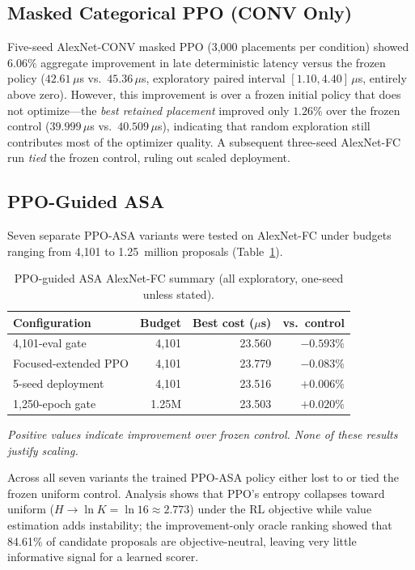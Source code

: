 \documentclass[10pt,conference]{IEEEtran}
\begin{document}
\subsection{Masked Categorical PPO (CONV Only)}

Five-seed AlexNet-CONV masked PPO (3,000 placements per condition) showed
$6.06\%$ aggregate improvement in late deterministic latency versus the frozen
policy ($42.61\,\mu$s vs.\ $45.36\,\mu$s, exploratory paired interval
$[1.10, 4.40]\,\mu$s, entirely above zero).  However, this improvement is over
a frozen initial policy that does not optimize---the \emph{best retained
placement} improved only $1.26\%$ over the frozen control ($39.999\,\mu$s
vs.\ $40.509\,\mu$s), indicating that random exploration still contributes most
of the optimizer quality.  A subsequent three-seed AlexNet-FC run
\emph{tied} the frozen control, ruling out scaled deployment.

\subsection{PPO-Guided ASA}

Seven separate PPO-ASA variants were tested on AlexNet-FC under budgets ranging
from 4,101 to 1.25~million proposals (Table~\ref{tab:ppo-asa}).

\begin{table}[htbp]
  \caption{PPO-guided ASA AlexNet-FC summary (all exploratory, one-seed
           unless stated).}
  \label{tab:ppo-asa}
  \centering
  \small
  \begin{tabular}{lrrr}
    \toprule
    Configuration & Budget & Best cost ($\mu$s) & vs.\ control \\
    \midrule
    4,101-eval gate       & 4,101    & 23.560 & $-0.593\%$ \\
    Focused-extended PPO  & 4,101    & 23.779 & $-0.083\%$ \\
    5-seed deployment     & 4,101    & 23.516 & $+0.006\%$ \\
    1,250-epoch gate      & 1.25M    & 23.503 & $+0.020\%$ \\
    \bottomrule
  \end{tabular}
  \vspace{0.5ex}
  \small{\textit{Positive values indicate improvement over frozen control.
  None of these results justify scaling.}}
\end{table}

Across all seven variants the trained PPO-ASA policy either lost to or tied the
frozen uniform control.  Analysis shows that PPO's entropy collapses toward
uniform ($H \to \ln K = \ln 16 \approx 2.773$) under the RL objective while
value estimation adds instability; the improvement-only oracle ranking showed
that 84.61\% of candidate proposals are objective-neutral, leaving very little
informative signal for a learned scorer.
\end{document}
